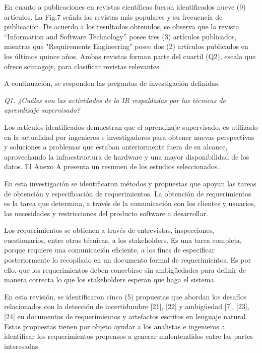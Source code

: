 \documentclass[journal]{IEEEtran}
\begin{document}
En cuanto a publicaciones en revistas científicas fueron identificados nueve (9) artículos. La Fig.7 señala las revistas más populares y su frecuencia de publicación. De acuerdo a los resultados obtenidos, se observa que la revista “Information and Software Technology” posee tres (3) artículos publicados, mientras que "Requirements Engineering" posee dos (2) artículos publicados en los últimos quince años. Ambas revistas forman parte del cuartil (Q2), escala que ofrece scimagojr, para clasificar revistas relevantes. 

A continuación, se responden las preguntas de investigación definidas.

\emph{Q1. ¿Cuáles son las actividades de la IR respaldadas por las técnicas de aprendizaje supervisado?}

Los artículos identificados demuestran que el aprendizaje supervisado, es utilizado en la actualidad por ingenieros e investigadores para obtener nuevas perspectivas y soluciones a problemas que estaban anteriormente fuera de su alcance, aprovechando la infraestructura de hardware y una mayor disponibilidad de los datos. El Anexo A presenta un resumen de los estudios seleccionados.

En esta investigación se identificaron métodos y propuestas que apoyan las tareas de obtención y especificación de requerimientos. La obtención de requerimientos es la tarea que determina, a través de la comunicación con los clientes y usuarios, las necesidades y restricciones del producto software a desarrollar.
 
Los requerimientos se obtienen a través de entrevistas, inspecciones, cuestionarios, entre otras técnicas, a los stakeholders. Es una tarea compleja, porque requiere una comunicación eficiente, a los fines de especificar posteriormente lo recopilado en un documento formal de requerimientos. Es por ello, que los requerimientos deben concebirse sin ambigüedades para definir de manera correcta lo que los stakeholders esperan que haga el sistema.

En esta revisión, se identificaron cinco (5) propuestas que abordan los desafíos relacionados con la detección de incertidumbre \cite{yang2012speculative}[21], \cite{Knauss201685}[22] y ambigüedad \cite{yang2010extending}[7], \cite{Yang2011}[23], \cite{Ott2013}[24] en documentos de requerimientos y artefactos escritos en lenguaje natural. Estas propuestas tienen por objeto ayudar a los analistas e ingenieros a identificar los requerimientos propensos a generar malentendidos entre las partes interesadas.
\end{document}
